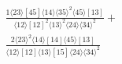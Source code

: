 \documentclass[varwidth, border=5pt]{standalone}
\begin{document}
\begin{my}
$\begin{gathered}
\scriptscriptstyle\frac{1⟨23⟩[45]⟨14⟩⟨35⟩^2⟨45⟩[13]}{⟨12⟩[12]^2⟨13⟩^2⟨24⟩⟨34⟩^2}+\\
\scriptscriptstyle\frac{2⟨23⟩^2⟨14⟩[14]⟨45⟩[13]}{⟨12⟩[12]⟨13⟩[15]⟨24⟩⟨34⟩^2}\phantom{+}
\end{gathered}$
\end{my}
\end{document}
